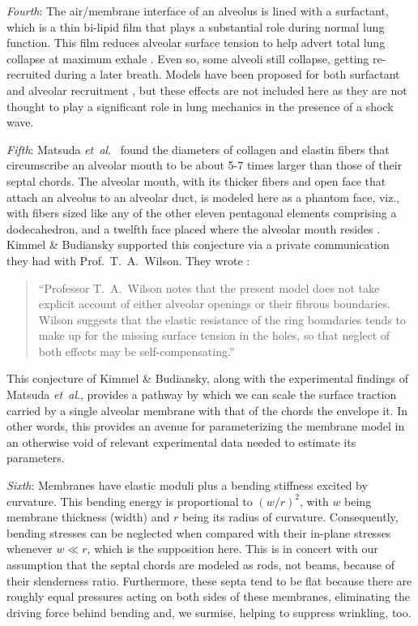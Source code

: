 \textit{Fourth\/}: The air\slash membrane interface of an alveolus is lined with a surfactant, which is a thin bi-lipid film that plays a substantial role during normal lung function.  This film reduces alveolar surface tension to help advert total lung collapse at maximum exhale \cite{Stamenovic90}.  Even so, some alveoli still collapse, getting re-recruited during a later breath.  Models have been proposed for both surfactant \cite{Hills99} and alveolar recruitment \cite{Bates07}, but these effects are not included here as they are not thought to play a significant role in lung mechanics in the presence of a shock wave. 

\textit{Fifth\/}: Matsuda \textit{et~al}.\ \cite{Matsudaetal87} found the diameters of collagen and elastin fibers that circumscribe an alveolar mouth to be about 5-7 times larger than those of their septal chords.  The alveolar mouth, with its thicker fibers and open face that attach an alveolus to an alveolar duct, is modeled here as a phantom face, viz., with fibers sized like any of the other eleven pentagonal elements comprising a dodecahedron, and a twelfth face placed where the alveolar mouth resides \cite{Freedetal12}.  Kimmel \& Budiansky supported this conjecture via a private communication they had with Prof.\ T.\ A.\ Wilson.  They wrote \cite{KimmelBudiansky90}:
\small
\begin{quote}
    ``Professor T.\ A.\ Wilson notes that the present model does not take explicit account of either alveolar openings or their fibrous boundaries.  Wilson suggests that the elastic resistance of the ring boundaries tends to make up for the missing surface tension in the holes, so that neglect of both effects may be self-compensating.''
\end{quote}
\normalsize
This conjecture of Kimmel \& Budiansky, along with the experimental findings of Matsuda \textit{et~al}., provides a pathway by which we can scale the surface traction carried by a single alveolar membrane with that of the chords the envelope it.  In other words, this provides an avenue for parameterizing the membrane model in an otherwise void of relevant experimental data needed to estimate its parameters.

\textit{Sixth\/}: Membranes have elastic moduli plus a bending stiffness excited by curvature.  This bending energy is proportional to $(w/r)^2$, with $w$ being membrane thickness (width) and $r$ being its radius of curvature.  Consequently, bending stresses can be neglected when compared with their in-plane stresses whenever $w \ll r$, which is the supposition here.  This is in concert with our assumption that the septal chords are modeled as rods, not beams, because of their slenderness ratio.  Furthermore, these septa tend to be flat because there are roughly equal pressures acting on both sides of these membranes, eliminating the driving force behind bending \cite{HoppinHildebrandt77} and, we surmise, helping to suppress wrinkling, too.

